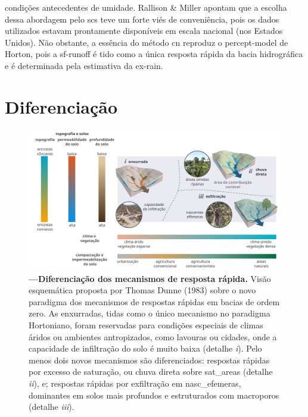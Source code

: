 \documentclass[./main.tex]{subfiles}
\begin{document}
condições antecedentes de umidade. Rallison \& Miller apontam que a escolha dessa abordagem pelo \acrshort{scs} teve um forte viés de conveniência, pois os dados utilizados estavam prontamente disponíveis em escala nacional (nos Estados Unidos). Não obstante, a essência do método \acrshort{cn} reproduz o \gls{percept-model} de Horton, pois a \gls{sf-runoff} é tido como a única resposta rápida da bacia hidrográfica e é determinada pela estimativa da \gls{ex-rain}. 

\section{Diferenciação}

\begin{figure}[t!] 
\centering				
\includegraphics[width=0.98\linewidth]{figs/fig_processes.jpg}		
\caption[Diferenciação dos mecanismos de resposta rápida.]
{\textbf{---\;Diferenciação dos mecanismos de resposta rápida.}
    Visão esquemática proposta por Thomas Dunne (1983) \cite{Dunne1983} sobre o novo \gls{paradigma} dos mecanismos de respostas rápidas em bacias de ordem zero. As enxurradas, tidas como o único mecanismo no \gls{paradigma} Hortoniano, foram reservadas para condições especiais de climas áridos ou ambientes antropizados, como lavouras ou cidades, onde a capacidade de infiltração do solo é muito baixa (detalhe \textrm{\textit{i}}). Pelo menos dois novos mecanismos são diferenciados: respostas rápidas por excesso de saturação, ou chuva direta sobre \gls{sat_areas} (detalhe \textrm{\textit{ii}}), e; respostas rápidas por exfiltração em \gls{nasc_efemeras}, dominantes em solos mais profundos e estruturados com macroporos (detalhe \textrm{\textit{iii}}).
}
\label{fig:hydro:diff} 		
\end{figure}
\end{document}

